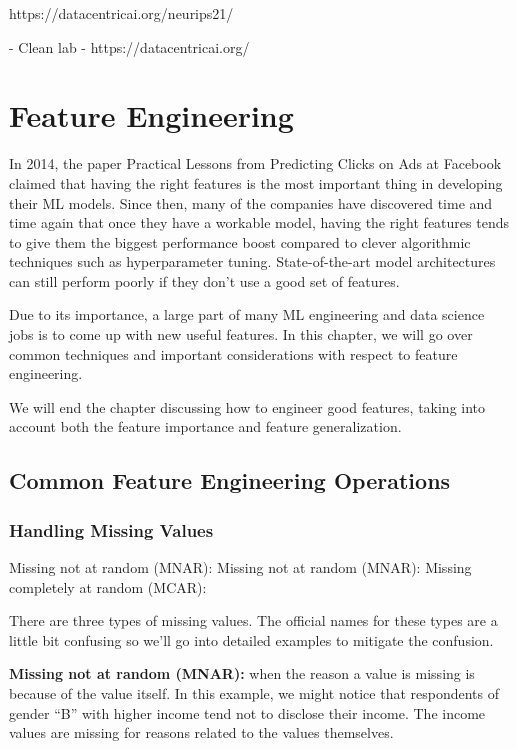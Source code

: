 \documentclass[openany]{book}
\begin{document}
https://datacentricai.org/neurips21/

- Clean lab 
- https://datacentricai.org/



\chapter{Feature Engineering}

In 2014, the paper Practical Lessons from Predicting Clicks on Ads at Facebook claimed that having the right features is the most important thing in developing their ML models. Since then, many of the companies  have discovered time and time again that once they have a workable model, having the right features tends to give them the biggest performance boost compared to clever algorithmic techniques such as hyperparameter tuning. State-of-the-art model architectures can still perform poorly if they don’t use a good set of features.

Due to its importance, a large part of many ML engineering and data science jobs is to come up with new useful features. In this chapter, we will go over common techniques and important considerations with respect to feature engineering. 

We will end the chapter discussing how to engineer good features, taking into account both the feature importance and feature generalization.

\section{Common Feature Engineering Operations}


\subsection{Handling Missing Values}

Missing not at random (MNAR): 
Missing not at random (MNAR): 
Missing completely at random (MCAR):


There are three types of missing values. The official names for these types are a little bit confusing so we’ll go into detailed examples to mitigate the confusion.

\textbf{Missing not at random (MNAR): }when the reason a value is missing is because of the value itself. In this example, we might notice that respondents of gender “B” with higher income tend not to disclose their income. The income values are missing for reasons related to the values themselves.
\end{document}
